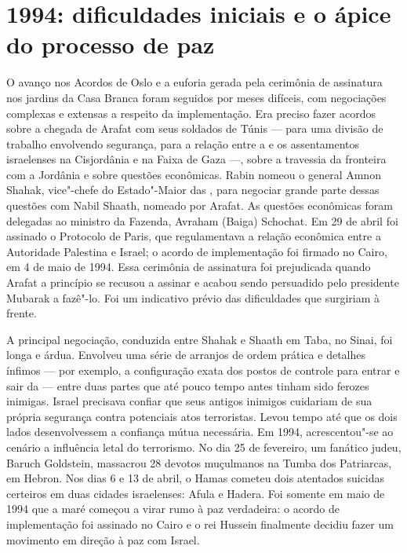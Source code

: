 \section{1994: dificuldades iniciais e o ápice do processo de paz}

O avanço nos Acordos de Oslo e a euforia gerada pela cerimônia de
assinatura nos jardins da Casa Branca foram seguidos por meses difíceis,
com negociações complexas e extensas a respeito da implementação. Era
preciso fazer acordos sobre a chegada de Arafat com seus soldados de
Túnis --- para uma divisão de trabalho envolvendo segurança, para a
relação entre a  e os assentamentos israelenses na Cisjordânia e na
Faixa de Gaza ---, sobre a travessia da fronteira com a Jordânia e sobre
questões econômicas. Rabin nomeou o general Amnon Shahak, vice"-chefe do
Estado"-Maior das , para negociar grande parte dessas questões com
Nabil Shaath, nomeado por Arafat. As questões econômicas foram delegadas
ao ministro da Fazenda, Avraham (Baiga) Schochat. Em 29 de abril foi
assinado o Protocolo de Paris, que regulamentava a relação econômica
entre a Autoridade Palestina e Israel; o acordo de implementação foi
firmado no Cairo, em 4 de maio de 1994. Essa cerimônia de assinatura
foi prejudicada quando Arafat a princípio se recusou a assinar e acabou
sendo persuadido pelo presidente Mubarak a fazê"-lo. Foi um indicativo
prévio das dificuldades que surgiriam à frente.

A principal negociação, conduzida entre Shahak e Shaath em Taba, no
Sinai, foi longa e árdua. Envolveu uma série de arranjos de ordem
prática e detalhes ínfimos --- por exemplo, a configuração exata dos
postos de controle para entrar e sair da  --- entre duas partes que até
pouco tempo antes tinham sido ferozes inimigas. Israel precisava confiar
que seus antigos inimigos cuidariam de sua própria segurança contra
potenciais atos terroristas. Levou tempo até que os dois lados
desenvolvessem a confiança mútua necessária. Em 1994, acrescentou"-se ao
cenário a influência letal do terrorismo. No dia 25 de fevereiro, um
fanático judeu, Baruch Goldstein, massacrou 28 devotos
muçulmanos na Tumba dos Patriarcas, em Hebron. Nos dias 6 e 13 de abril,
o Hamas cometeu dois atentados suicidas certeiros em duas cidades
israelenses: Afula e Hadera. Foi somente em maio de 1994 que a maré
começou a virar rumo à paz verdadeira: o acordo de implementação foi
assinado no Cairo e o rei Hussein finalmente decidiu fazer um movimento
em direção à paz com Israel.

